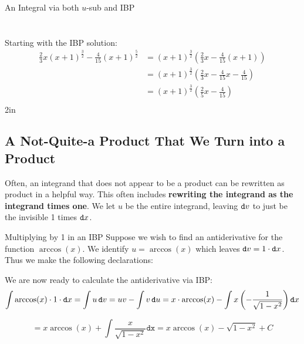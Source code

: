 \begin{exercise}{An Integral via both $u$-sub and IBP \Coffeecup \Coffeecup \Coffeecup}
\begin{itemize}
{\begin{align*}
\end{align*}
\\
Starting with the IBP solution:
\begin{align*}
\frac{2}{3}x(x+1)^\frac{3}{2} -\frac{4}{15}(x+1)^\frac{5}{2} &= (x+1)^\frac{3}{2}\left(\frac{2}{3}x -\frac{4}{15}(x+1) \right)\\
&= (x+1)^\frac{3}{2}\left(\frac{2}{3}x -\frac{4}{15}x-\frac{4}{15} \right)\\
&=(x+1)^\frac{3}{2}\left(\frac{2}{5}x -\frac{4} {15}\right) \\
\end{align*}}{2in}
\end{itemize}
\end{exercise}

\subsection{A Not-Quite-a Product That We Turn into a Product} Often, an integrand that does not appear to be a product can be rewritten as product in a helpful way.  This often includes {\bf rewriting the integrand as the integrand times one}.  We let $u$ be the entire integrand, leaving $\mathop{}\!\mathtt{d} v$ to just be the invisible 1 times $\mathop{}\!\mathtt{d} x$.

\begin{example}{Multiplying by 1 in an IBP}
 Suppose we wish to find an antiderivative for the function $\arccos(x)$.  We identify $u=\arccos(x)$ which leaves $\mathop{}\!\mathtt{d} v=1\cdot \mathop{}\!\mathtt{d} x$.  Thus we make the following declarations:

We are now ready to calculate the antiderivative via IBP:
$$\int \arccos(x)\cdot 1 \cdot \mathop{}\!\mathtt{d} x = \int u \mathop{}\!\mathtt{d} v = uv-\int v \mathop{}\!\mathtt{d} u = x\cdot \arccos(x) - \int x \left( -\frac{1}{\sqrt{1-x^2}} \right) \mathop{}\!\mathtt{d} x $$

$$= x\arccos(x) + \int \frac{x}{\sqrt{1-x^2}} \mathtt{dx}=x\arccos(x)-\sqrt{1-x^2}+C $$

\end{example}

